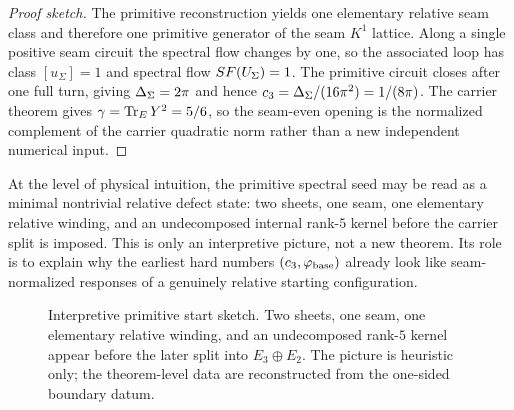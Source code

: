 \begin{proof}[Proof sketch]
The primitive reconstruction yields one elementary relative seam class and therefore one primitive
generator of the seam $K^1$ lattice. Along a single positive seam circuit the spectral flow changes
by one, so the associated loop has class $[u_\Sigma]=1$ and spectral flow $SF(U_\Sigma)=1$. The
primitive circuit closes after one full turn, giving $\Delta_\Sigma=2\pi$ and hence
$c_3=\Delta_\Sigma/(16\pi^2)=1/(8\pi)$. The carrier theorem gives
$\gamma=\operatorname{Tr}_EY^2=5/6$, so the seam-even opening is the normalized complement of the carrier
quadratic norm rather than a new independent numerical input.
\end{proof}

\begin{remark}
At the level of physical intuition, the primitive spectral seed may be read as a minimal nontrivial relative defect state: two sheets, one seam, one elementary relative winding, and an undecomposed internal rank-$5$ kernel before the carrier split is imposed. This is only an interpretive picture, not a new theorem. Its role is to explain why the earliest hard numbers $(c_3,\varphi_{\mathrm{base}})$ already look like seam-normalized responses of a genuinely relative starting configuration.
\end{remark}

\begin{figure}[t]
\centering
\scriptsize
{}
\caption{Interpretive primitive start sketch. Two sheets, one seam, one elementary relative winding,
and an undecomposed rank-$5$ kernel appear before the later split into $E_3\oplus E_2$.
The picture is heuristic only; the theorem-level data are reconstructed from the one-sided
boundary datum.}
\label{fig:primitive-start-sketch}
\end{figure}

